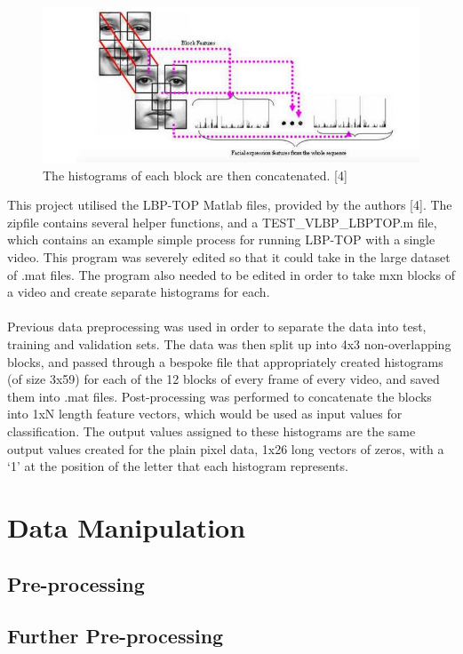 \documentclass[12pt,twoside]{report}
\begin{document}
\begin{figure}[tb]
\centering
\includegraphics[width = 0.8\hsize]{./figures/lbptopprocess2}
\caption{The histograms of each block are then concatenated. [4]}
\label{fig:avletters2}
\end{figure} 

This project utilised the LBP-TOP Matlab files, provided by the authors [4]. The zipfile contains several helper functions, and a TEST\_VLBP\_LBPTOP.m file, which contains an example simple process for running LBP-TOP with a single video. This program was severely edited so that it could take in the large dataset of .mat files. The program also needed to be edited in order to take mxn blocks of a video and create separate histograms for each. 
\\ \\
Previous data preprocessing was used in order to separate the data into test, training and validation sets. The data was then split up into 4x3 non-overlapping blocks, and passed through a bespoke file that appropriately created histograms (of size 3x59) for each of the 12 blocks of every frame of every video, and saved them into .mat files. Post-processing was performed to concatenate the blocks into 1xN length feature vectors, which would be used as input values for classification. The output values assigned to these histograms are the same output values created for the plain pixel data, 1x26 long vectors of zeros, with a ‘1’ at the position of the letter that each histogram represents.


\chapter{Data Manipulation}
	\section{Pre-processing}
	\section{Further Pre-processing}
\end{document}
